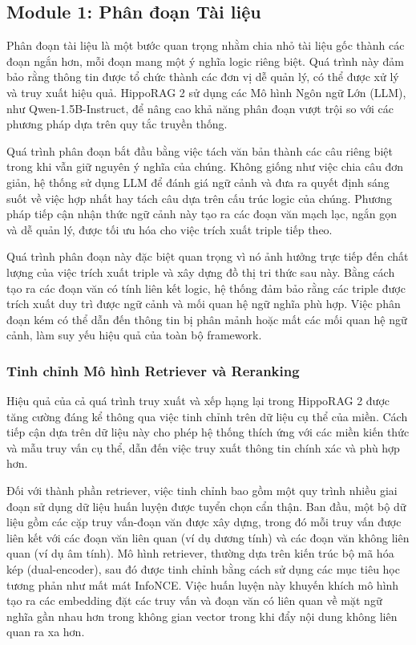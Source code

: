 \documentclass[../main.tex]{subfiles}
\begin{document}
\subsection{Module 1: Phân đoạn Tài liệu}
Phân đoạn tài liệu là một bước quan trọng nhằm chia nhỏ tài liệu gốc thành các đoạn ngắn hơn, mỗi đoạn mang một ý nghĩa logic riêng biệt. Quá trình này đảm bảo rằng thông tin được tổ chức thành các đơn vị dễ quản lý, có thể được xử lý và truy xuất hiệu quả. HippoRAG 2 sử dụng các Mô hình Ngôn ngữ Lớn (LLM), như Qwen-1.5B-Instruct, để nâng cao khả năng phân đoạn vượt trội so với các phương pháp dựa trên quy tắc truyền thống.

Quá trình phân đoạn bắt đầu bằng việc tách văn bản thành các câu riêng biệt trong khi vẫn giữ nguyên ý nghĩa của chúng. Không giống như việc chia câu đơn giản, hệ thống sử dụng LLM để đánh giá ngữ cảnh và đưa ra quyết định sáng suốt về việc hợp nhất hay tách câu dựa trên cấu trúc logic của chúng. Phương pháp tiếp cận nhận thức ngữ cảnh này tạo ra các đoạn văn mạch lạc, ngắn gọn và dễ quản lý, được tối ưu hóa cho việc trích xuất triple tiếp theo.

Quá trình phân đoạn này đặc biệt quan trọng vì nó ảnh hưởng trực tiếp đến chất lượng của việc trích xuất triple và xây dựng đồ thị tri thức sau này. Bằng cách tạo ra các đoạn văn có tính liên kết logic, hệ thống đảm bảo rằng các triple được trích xuất duy trì được ngữ cảnh và mối quan hệ ngữ nghĩa phù hợp. Việc phân đoạn kém có thể dẫn đến thông tin bị phân mảnh hoặc mất các mối quan hệ ngữ cảnh, làm suy yếu hiệu quả của toàn bộ framework.

\subsubsection{Tinh chỉnh Mô hình Retriever và Reranking}
Hiệu quả của cả quá trình truy xuất và xếp hạng lại trong HippoRAG 2 được tăng cường đáng kể thông qua việc tinh chỉnh trên dữ liệu cụ thể của miền. Cách tiếp cận dựa trên dữ liệu này cho phép hệ thống thích ứng với các miền kiến thức và mẫu truy vấn cụ thể, dẫn đến việc truy xuất thông tin chính xác và phù hợp hơn.

Đối với thành phần retriever, việc tinh chỉnh bao gồm một quy trình nhiều giai đoạn sử dụng dữ liệu huấn luyện được tuyển chọn cẩn thận. Ban đầu, một bộ dữ liệu gồm các cặp truy vấn-đoạn văn được xây dựng, trong đó mỗi truy vấn được liên kết với các đoạn văn liên quan (ví dụ dương tính) và các đoạn văn không liên quan (ví dụ âm tính). Mô hình retriever, thường dựa trên kiến trúc bộ mã hóa kép (dual-encoder), sau đó được tinh chỉnh bằng cách sử dụng các mục tiêu học tương phản như mất mát InfoNCE. Việc huấn luyện này khuyến khích mô hình tạo ra các embedding đặt các truy vấn và đoạn văn có liên quan về mặt ngữ nghĩa gần nhau hơn trong không gian vector trong khi đẩy nội dung không liên quan ra xa hơn.
\end{document}
